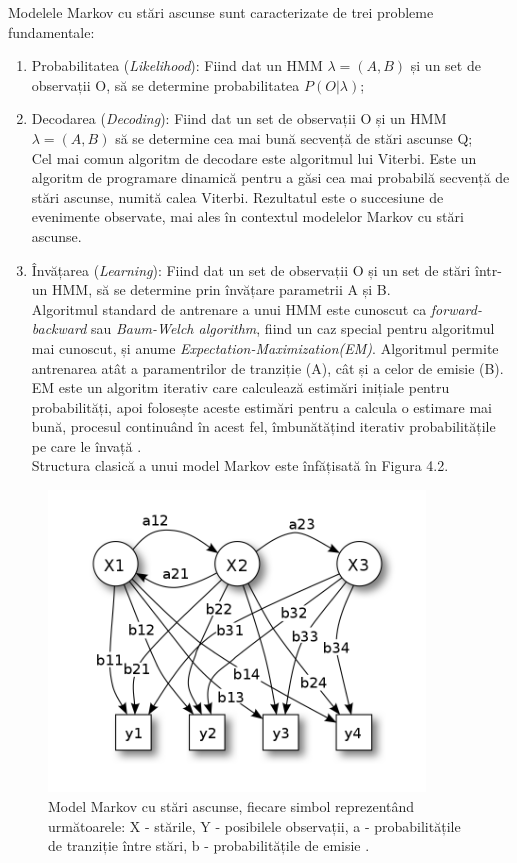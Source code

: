 \documentclass[a4paper,12pt]{report}
\begin{document}
Modelele Markov cu stări ascunse sunt caracterizate de trei probleme fundamentale:
\begin{enumerate}
    \item Probabilitatea (\emph{Likelihood}): Fiind dat un HMM $\lambda = (A,B)$ și un set de observații O, 
    să se determine probabilitatea $P(O | \lambda)$;
    \item Decodarea (\emph{Decoding}): Fiind dat un set de observații O și un HMM $\lambda = (A,B)$
    să se determine cea mai bună secvență de stări ascunse Q;
    \\
    Cel mai comun algoritm de decodare este algoritmul lui Viterbi.
    Este un algoritm de programare dinamică pentru a găsi cea mai probabilă secvență de stări
    ascunse, numită calea Viterbi. Rezultatul este o succesiune de evenimente observate, mai 
    ales în contextul modelelor Markov cu stări ascunse.
    \item Învățarea (\emph{Learning}): Fiind dat un set de observații O și un set de stări 
    într-un HMM, să se determine prin învățare parametrii A și B.
    \\
    Algoritmul standard de antrenare a unui HMM este cunoscut ca \emph{forward-backward} sau 
    \emph{Baum-Welch algorithm}, fiind un caz special pentru algoritmul mai cunoscut, și anume
    \emph{Expectation-Maximization(EM)}. Algoritmul permite antrenarea atât a paramentrilor de tranziție (A), 
    cât și a celor de emisie (B). EM este un algoritm iterativ care calculează estimări inițiale
    pentru probabilități, apoi folosește aceste estimări pentru a calcula o estimare mai bună, procesul
    continuând în acest fel, îmbunătățind iterativ probabilitățile pe care le învață \cite{Speech-and-Language-Processing}.
    \\
    Structura clasică a unui model Markov este înfățisată în Figura 4.2.

\end{enumerate}

\begin{figure}[h!]
    \centering
    \includegraphics[width=10cm]{..//resources//images//hmm_model.png} 
    \caption{Model Markov cu stări ascunse, fiecare simbol reprezentând următoarele: X - stările, Y - posibilele observații, 
    a - probabilitățile de tranziție între stări, b - probabilitățile de emisie \cite{WEBSITE:hmm-model-figure}.}
\end{figure}
\end{document}
